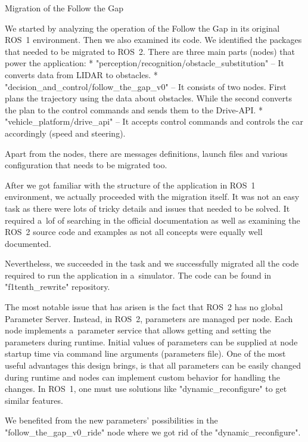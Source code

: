  Migration of the Follow the Gap

We started by analyzing the operation of the Follow the Gap in its original ROS~1 environment.
Then we also examined its code. We identified the packages that needed to be migrated to ROS~2.
There are three main parts (nodes) that power the application:
\begitems
* "perception/recognition/obstacle_substitution" – It converts data from LIDAR to obstacles.
* "decision_and_control/follow_the_gap_v0" – It consists of two nodes. First plans the trajectory using the data
about obstacles.
While the second converts the plan to the control commands and sends them to the Drive-API.
* "vehicle_platform/drive_api" – It accepts control commands and controls the car accordingly (speed and steering).
\enditems

Apart from the nodes, there are messages definitions, launch files and various configuration that needs to be
migrated too.

After we got familiar with the structure of the application in ROS~1 environment, we actually proceeded
with the migration itself. It was not an easy task as there were lots of tricky details and issues that needed
to be solved. It required a~lof of searching in the official documentation as well as examining the ROS~2 source
code and examples as not all concepts were equally well documented.

Nevertheless, we {\sbf succeeded} in the task and we {\sbf successfully migrated} all the code required to run the
application in a~simulator. The code can be found
in "f1tenth_rewrite" repository.

The most notable issue that has arisen is the fact that ROS~2 has no global Parameter Server.
Instead, in ROS~2, parameters are managed per node. Each node implements a~parameter service that allows getting and
setting the parameters during runtime. Initial values of parameters can be supplied at node startup time via command
line arguments (parameters file). One of the most useful advantages this design brings, is that all parameters
can be easily changed during runtime and nodes can implement custom behavior for handling the changes.
In ROS~1, one must use solutions like "dynamic_reconfigure"
to get similar features.

We benefited from the new parameters' possibilities in the "follow_the_gap_v0_ride" node where we got rid of the
"dynamic_reconfigure".

